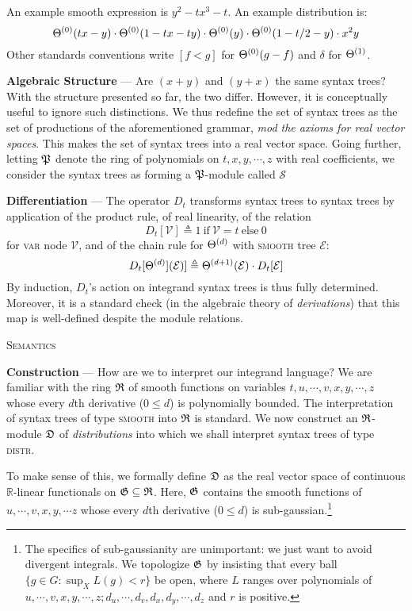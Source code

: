     An example smooth expression is $y^2 - t x^3 - t$.  An example distribution
    is:
    $$
        \Theta^{(0)}(tx-y)\cdot\Theta^{(0)}(1-tx-ty)\cdot\Theta^{(0)}(y)\cdot\Theta^{(0)}(1-t/2-y)
        \cdot x^2 y
    $$
    Other standards conventions write $[f<g]$ for $\Theta^{(0)}(g-f)$ and $\delta$
    for $\Theta^{(1)}$.

    \textbf{Algebraic Structure} ---
    Are $(x+y)$ and $(y+x)$ the same syntax trees?  With the structure
    presented so far, the two differ.  However, it is conceptually useful to
    ignore such distinctions.  We thus redefine the set of syntax trees as the
    set of productions of the aforementioned grammar, \emph{mod the axioms for
    real vector spaces}.  This makes the set of syntax trees into a real vector
    space.  Going further, letting $\frak P$ denote the ring of polynomials on
    $t,x,y,\cdots, z$ with real coefficients, we consider the syntax trees
    as forming a $\frak P$-module called $\mathcal S$ 

    \textbf{Differentiation} ---
    The operator $D_t$ transforms syntax trees to
    syntax trees by application of the product rule, of real linearity,
    of the relation 
    $$
        D_t[{\mathcal V}] \triangleq 1~\text{if}~{\mathcal V}=t~\text{else}~0
    $$
    for \textsc{var} node $\mathcal V$,
    and of the chain rule for $\Theta^{(d)}$ with \textsc{smooth} tree $\mathcal E$:
    $$
        D_t[\Theta^{(d)}]({\mathcal E})] \triangleq \Theta^{(d+1)}({\mathcal E}) \cdot D_t[{\mathcal E}]  
    $$
    By induction, $D_t$'s action on integrand syntax trees is thus fully
    determined.  Moreover, it is a standard check (in the algebraic theory of
    \emph{derivations}) that this map is well-defined despite the 
    module relations.

\begin{center}\large\textsc{Semantics}\end{center}

    \noindent\textbf{Construction} ---
    How are we to interpret our integrand language?  We are familiar with the
    ring $\frak R$ of smooth functions on variables $t,u,\cdots,v,x,y,\cdots,z$
    whose every $d$th derivative ($0\leq d$) is polynomially bounded.  The
    interpretation of syntax trees of type \textsc{smooth} into $\frak R$ is
    standard.  We now construct an $\frak R$-module $\frak D$ of
    \emph{distributions} into which we shall interpret syntax trees of type
    \textsc{distr}.

    To make sense of this, we formally define $\frak D$ as the real vector
    space of continuous $\mathbb{R}$-linear functionals on $\frak G \subseteq
    \frak R$.  Here, $\frak G$ contains the smooth
    functions of $u,\cdots,v,x,y,\cdots z$ whose every $d$th derivative ($0\leq
    d$) is sub-gaussian.\footnote{The specifics of sub-gaussianity are
    unimportant: we just want to avoid divergent integrals.  We topologize
    $\frak G$ by insisting that every ball $\{g \in G : \sup_X L(g) < r\}$ be
    open, where $L$ ranges over polynomials of
    $u,\cdots,v,x,y,\cdots,z;d_u,\cdots,d_v,d_x,d_y,\cdots,d_z$ and $r$ is
    positive.}

